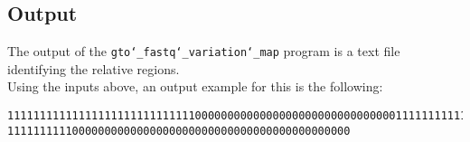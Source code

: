 \subsection*{Output}
The output of the \texttt{gto\char`_fastq\char`_variation\char`_map} program is a text file identifying the relative regions.\\
Using the inputs above, an output example for this is the following:
\begin{lstlisting}
1111111111111111111111111111100000000000000000000000000000001111111111111111111
11111111110000000000000000000000000000000000000000000
\end{lstlisting}